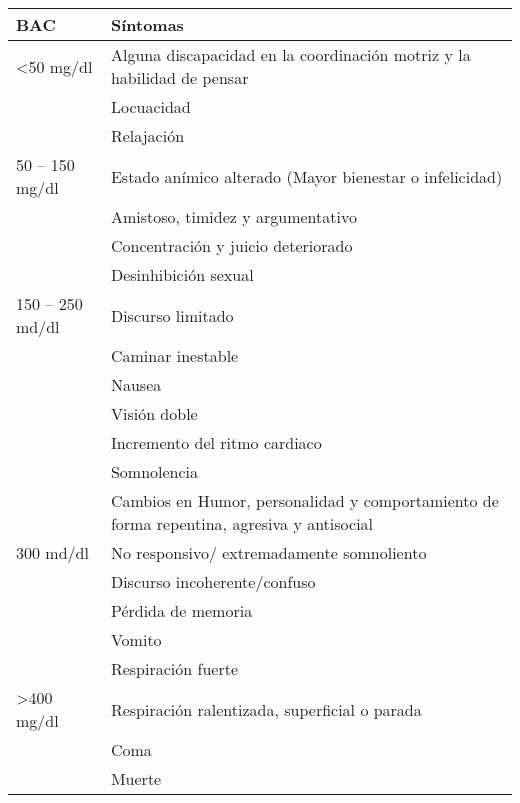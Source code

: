 \begin{table}[ht]
    \noindent \centering \resizebox{\textwidth}{!}
    {        
        \begin{tabular}{|l|l|}
            \hline
                BAC & Síntomas \\
            \hline
                \textless 50 mg/dl & Alguna discapacidad en la coordinación motriz y la habilidad de pensar \\
                           & Locuacidad \\
                           & Relajación \\
            \hline
                50 – 150 mg/dl & Estado anímico alterado (Mayor bienestar o infelicidad) \\
                               & Amistoso, timidez y argumentativo \\
                               & Concentración y juicio deteriorado \\
                               & Desinhibición sexual \\
        
            \hline
                150 – 250 md/dl & Discurso limitado \\
                                & Caminar inestable \\
                                & Nausea \\
                                & Visión doble \\
                                & Incremento del ritmo cardiaco \\
                                & Somnolencia \\
                                & Cambios en Humor, personalidad y comportamiento de forma repentina, agresiva y antisocial \\
        
            \hline
                300 md/dl & No responsivo/ extremadamente somnoliento \\
                          & Discurso incoherente/confuso \\
                          & Pérdida de memoria \\
                          & Vomito \\
                          & Respiración fuerte \\
        
            \hline
                \textgreater 400 mg/dl & Respiración ralentizada, superficial o parada \\
                            & Coma \\
                            & Muerte \\
        
            \hline
        \end{tabular}
    }
     \label{tab:sintomas_niveles} 
\end{table}